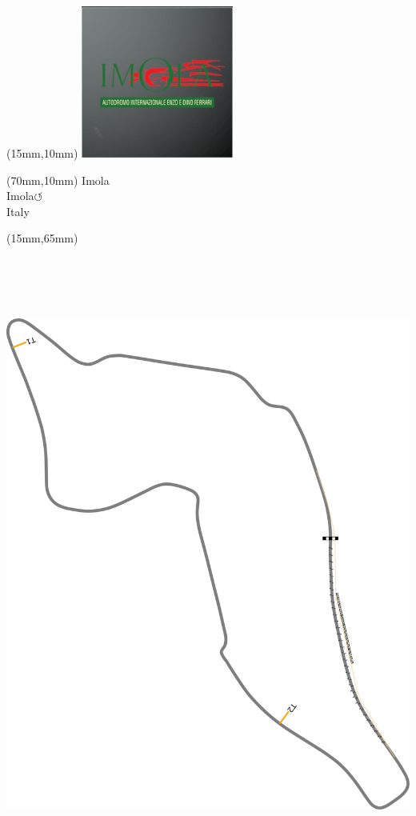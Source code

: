 \null\newpage
\begin{textblock*}{50mm}(15mm,10mm)%
\includegraphics[width=50mm]{LG/2015-05-20_00083.png}
\end{textblock*}
\begin{textblock*}{130mm}(70mm,10mm)%
{\fontsize{20}{20}\selectfont Imola\\}
{\fontsize{16}{16}\selectfont Imola\hfill \huge$\circlearrowleft$\\}
{\fontsize{12}{12}\selectfont Italy\\}
\end{textblock*}
\begin{textblock*}{185mm}(15mm,65mm)%
\centering
\mbox{\includegraphics[width=185mm,height=210mm,keepaspectratio]{PT/IMOL.pdf}}
\end{textblock*}
